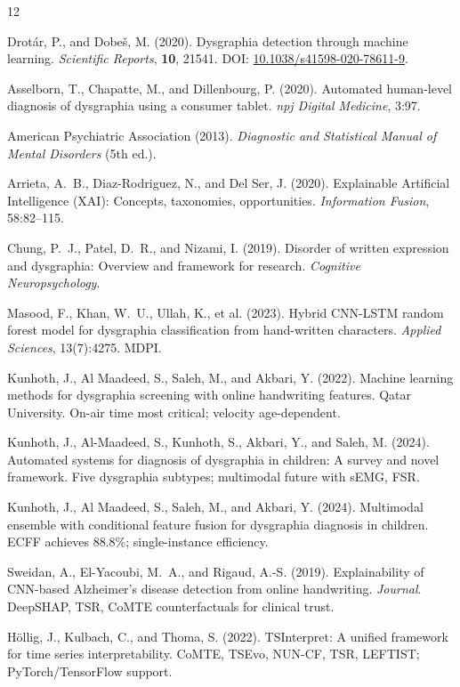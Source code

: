 \documentclass{article}
\begin{document}
\begin{thebibliography}{12}

Drot\'ar, P., and Dobe\v{s}, M. (2020).
\newblock Dysgraphia detection through machine learning.
\newblock \textit{Scientific Reports}, \textbf{10}, 21541.
\newblock DOI: \href{https://doi.org/10.1038/s41598-020-78611-9}{10.1038/s41598-020-78611-9}.

Asselborn, T., Chapatte, M., and Dillenbourg, P. (2020).
\newblock Automated human-level diagnosis of dysgraphia using a consumer tablet.
\newblock \textit{npj Digital Medicine}, 3:97.

American Psychiatric Association (2013).
\newblock \textit{Diagnostic and Statistical Manual of Mental Disorders} (5th ed.).

Arrieta, A.~B., Diaz-Rodriguez, N., and Del Ser, J. (2020).
\newblock Explainable Artificial Intelligence (XAI): Concepts, taxonomies, opportunities.
\newblock \textit{Information Fusion}, 58:82--115.

Chung, P.~J., Patel, D.~R., and Nizami, I. (2019).
\newblock Disorder of written expression and dysgraphia: Overview and framework for research.
\newblock \textit{Cognitive Neuropsychology}.

Masood, F., Khan, W.~U., Ullah, K., et al. (2023).
\newblock Hybrid CNN-LSTM random forest model for dysgraphia classification from hand-written characters.
\newblock \textit{Applied Sciences}, 13(7):4275. MDPI.

Kunhoth, J., Al Maadeed, S., Saleh, M., and Akbari, Y. (2022).
\newblock Machine learning methods for dysgraphia screening with online handwriting features.
\newblock Qatar University. On-air time most critical; velocity age-dependent.

Kunhoth, J., Al-Maadeed, S., Kunhoth, S., Akbari, Y., and Saleh, M. (2024).
\newblock Automated systems for diagnosis of dysgraphia in children: A survey and novel framework.
\newblock Five dysgraphia subtypes; multimodal future with sEMG, FSR.

Kunhoth, J., Al Maadeed, S., Saleh, M., and Akbari, Y. (2024).
\newblock Multimodal ensemble with conditional feature fusion for dysgraphia diagnosis in children.
\newblock ECFF achieves 88.8\%; single-instance efficiency.

Sweidan, A., El-Yacoubi, M.~A., and Rigaud, A.-S. (2019).
\newblock Explainability of CNN-based Alzheimer's disease detection from online handwriting.
\newblock \textit{Journal}. DeepSHAP, TSR, CoMTE counterfactuals for clinical trust.

Höllig, J., Kulbach, C., and Thoma, S. (2022).
\newblock TSInterpret: A unified framework for time series interpretability.
\newblock CoMTE, TSEvo, NUN-CF, TSR, LEFTIST; PyTorch/TensorFlow support.

\end{thebibliography}
\end{document}
